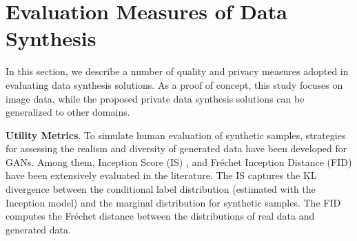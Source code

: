 \documentclass[conference]{IEEEtran}
\newcommand{\partitle}[1]{\smallskip \noindent \textbf{#1}.}
\begin{document}

\section{Evaluation Measures of Data Synthesis}
In this section, we describe a number of quality and privacy measures adopted in evaluating data synthesis solutions. As a proof of concept, this study focuses on image data, while the proposed private data synthesis solutions can be generalized to other domains. 

\partitle{Utility Metrics}
% 
To simulate human evaluation of synthetic samples, strategies for assessing the realism and diversity of generated data have been developed for GANs. Among them, Inception Score (IS) \cite{InceptionScore2016}, and Fréchet Inception Distance (FID) \cite{FidScore2017} have been extensively evaluated in the literature. The IS captures the KL divergence between the conditional label distribution (estimated with the Inception model) and the marginal distribution for synthetic samples. The FID computes the Fréchet distance between the distributions of real data and generated data. %
\end{document}
